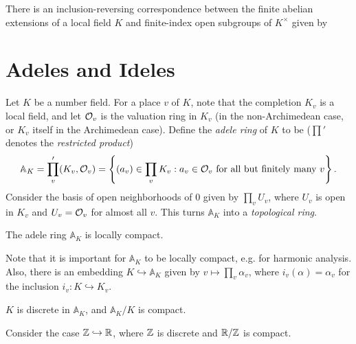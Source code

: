 \begin{theorem}
  There is an inclusion-reversing
  correspondence between the finite
  abelian extensions of a local field $K$ and
  finite-index open subgroups of $K^\times$
  given by
  \begin{center}
  \end{center}
\end{theorem}

\section{Adeles and Ideles}

\begin{definition}
  Let $K$ be a number field. For a place
  $v$ of $K$, note that the completion $K_v$ is
  a local field, and
  let $\mathcal{O}_v$ is the valuation ring in
  $K_v$ (in the non-Archimedean case, or
  $K_v$ itself in the Archimedean case).
  Define the \emph{adele ring} of $K$ to be
  ($\prod'$ denotes the \emph{restricted product})
  \[
    \mathbb{A}_K = \prod_v' (K_v, \mathcal{O}_v)
    = \left\{(a_v) \in \prod_v K_v : a_v \in \mathcal{O}_v \text{ for all but finitely many } v\right\}.
  \]
  Consider the basis of open neighborhoods
  of $0$ given by $\prod_v U_v$, where
  $U_v$ is open in $K_v$ and $U_v = \mathcal{O}_v$
  for almost all $v$. This turns
  $\mathbb{A}_K$ into a \emph{topological ring}.
\end{definition}

\begin{theorem}
  The adele ring $\mathbb{A}_K$ is locally
  compact.
\end{theorem}

\begin{remark}
  Note that it is important for $\mathbb{A}_K$
  to be locally compact, e.g. for harmonic
  analysis. Also,
  there is an embedding $K \hookrightarrow \mathbb{A}_K$
  given by
  $v \mapsto \prod_v \alpha_v$, where
  $i_v(\alpha) = \alpha_v$ for the inclusion
  $i_v : K \hookrightarrow K_v$.
\end{remark}

\begin{theorem}
  $K$ is discrete in $\mathbb{A}_K$, and
  $\mathbb{A}_K / K$ is compact.
\end{theorem}

\begin{example}
  Consider the case $\mathbb{Z} \hookrightarrow \mathbb{R}$,
  where $\mathbb{Z}$ is discrete and $\mathbb{R} / \mathbb{Z}$ is compact.
\end{example}

